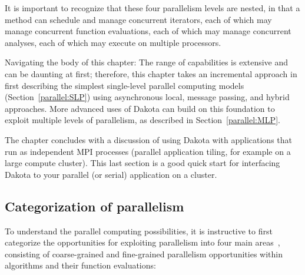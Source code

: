 It is important to recognize that these four parallelism levels are
nested, in that a method can schedule and manage concurrent
iterators, each of which may manage concurrent function evaluations,
each of which may manage concurrent analyses, each of which may
execute on multiple processors. 

Navigating the body of this chapter: The range of capabilities is
extensive and can be daunting at first; therefore, this chapter takes
an incremental approach in first describing the simplest single-level
parallel computing models (Section~\ref{parallel:SLP}) using
asynchronous local, message passing, and hybrid approaches.  More
advanced uses of Dakota can build on this foundation to exploit
multiple levels of parallelism, as described in
Section~\ref{parallel:MLP}.

The chapter concludes with a discussion of using Dakota with
applications that run as independent MPI processes (parallel
application tiling, for example on a large compute cluster).  This
last section is a good quick start for interfacing Dakota to your
parallel (or serial) application on a cluster.



\subsection{Categorization of parallelism}\label{parallel:overview:cat}

To understand the parallel computing possibilities, it is instructive
to first categorize the opportunities for exploiting parallelism into
four main areas~\cite{Eld98a}, consisting of coarse-grained and
fine-grained parallelism opportunities within algorithms and their
function evaluations:

